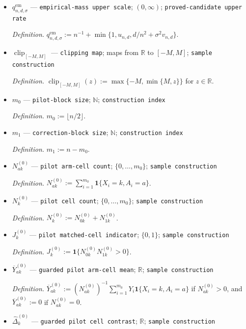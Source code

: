 \documentclass{article}
\begin{document}
\begin{itemize}
  \item \(q_{n,d,\sigma}^{\mathrm{em}}\) --- \texttt{empirical-\allowbreak{}mass upper scale}; \((0,\infty)\); \texttt{proved-\allowbreak{}candidate upper rate}
  \par\smallskip\noindent\emph{Definition.} \(q_{n,d,\sigma}^{\mathrm{em}}:=n^{-1}+\min\{1,u_{n,d},d/n^2+\sigma^2v_{n,d}\}\).
  \item \(\operatorname{clip}_{[-M,M]}\) --- \texttt{clipping map}; maps from \(\mathbb R\) to \([-M,M]\); \texttt{sample construction}
  \par\smallskip\noindent\emph{Definition.} \(\operatorname{clip}_{[-M,M]}(z):=\max\{-M,\min\{M,z\}\}\) for \(z\in\mathbb R\).
  \item \(m_0\) --- \texttt{pilot-\allowbreak{}block size}; \(\mathbb N\); \texttt{construction index}
  \par\smallskip\noindent\emph{Definition.} \(m_0:=\lfloor n/2\rfloor\).
  \item \(m_1\) --- \texttt{correction-\allowbreak{}block size}; \(\mathbb N\); \texttt{construction index}
  \par\smallskip\noindent\emph{Definition.} \(m_1:=n-m_0\).
  \item \(N_{ak}^{(0)}\) --- \texttt{pilot arm-\allowbreak{}cell count}; \(\{0,\ldots,m_0\}\); \texttt{sample construction}
  \par\smallskip\noindent\emph{Definition.} \(N_{ak}^{(0)}:=\sum_{i=1}^{m_0}\mathbf 1\{X_i=k,A_i=a\}\).
  \item \(N_k^{(0)}\) --- \texttt{pilot cell count}; \(\{0,\ldots,m_0\}\); \texttt{sample construction}
  \par\smallskip\noindent\emph{Definition.} \(N_k^{(0)}:=N_{0k}^{(0)}+N_{1k}^{(0)}\).
  \item \(J_k^{(0)}\) --- \texttt{pilot matched-\allowbreak{}cell indicator}; \(\{0,1\}\); \texttt{sample construction}
  \par\smallskip\noindent\emph{Definition.} \(J_k^{(0)}:=\mathbf 1\{N_{0k}^{(0)}N_{1k}^{(0)}>0\}\).
  \item \(\overline Y_{ak}^{(0)}\) --- \texttt{guarded pilot arm-\allowbreak{}cell mean}; \(\mathbb R\); \texttt{sample construction}
  \par\smallskip\noindent\emph{Definition.} \(\overline Y_{ak}^{(0)}:=(N_{ak}^{(0)})^{-1}\sum_{i=1}^{m_0}Y_i\mathbf 1\{X_i=k,A_i=a\}\) if \(N_{ak}^{(0)}>0\), and \(\overline Y_{ak}^{(0)}:=0\) if \(N_{ak}^{(0)}=0\).
  \item \(\widehat\Delta_k^{(0)}\) --- \texttt{guarded pilot cell contrast}; \(\mathbb R\); \texttt{sample construction}

\end{itemize}
\end{document}
